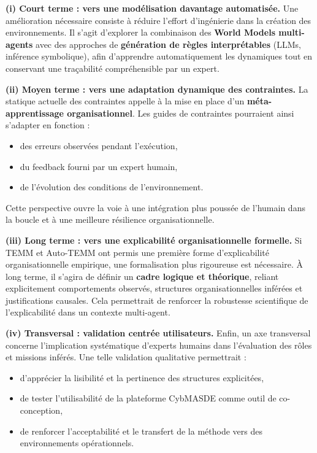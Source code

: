 \medskip
\noindent
\textbf{(i) Court terme : vers une modélisation davantage automatisée.}
Une amélioration nécessaire consiste à réduire l’effort d’ingénierie dans la création des environnements.
Il s’agit d’explorer la combinaison des \textbf{World Models multi-agents} avec des approches de \textbf{génération de règles interprétables} (LLMs, inférence symbolique), afin d’apprendre automatiquement les dynamiques tout en conservant une traçabilité compréhensible par un expert.

\medskip
\noindent
\textbf{(ii) Moyen terme : vers une adaptation dynamique des contraintes.}
La statique actuelle des contraintes appelle à la mise en place d’un \textbf{méta-apprentissage organisationnel}.
Les guides de contraintes pourraient ainsi s’adapter en fonction :
\begin{itemize}
  \item des erreurs observées pendant l’exécution,
  \item du feedback fourni par un expert humain,
  \item de l’évolution des conditions de l’environnement.
\end{itemize}
Cette perspective ouvre la voie à une intégration plus poussée de l’humain dans la boucle et à une meilleure résilience organisationnelle.

\medskip
\noindent
\textbf{(iii) Long terme : vers une explicabilité organisationnelle formelle.}
Si TEMM et Auto-TEMM ont permis une première forme d’explicabilité organisationnelle empirique, une formalisation plus rigoureuse est nécessaire.
À long terme, il s’agira de définir un \textbf{cadre logique et théorique}, reliant explicitement comportements observés, structures organisationnelles inférées et justifications causales.
Cela permettrait de renforcer la robustesse scientifique de l’explicabilité dans un contexte multi-agent.

\medskip
\noindent
\textbf{(iv) Transversal : validation centrée utilisateurs.}
Enfin, un axe transversal concerne l’implication systématique d’experts humains dans l’évaluation des rôles et missions inférés.
Une telle validation qualitative permettrait :
\begin{itemize}
  \item d’apprécier la lisibilité et la pertinence des structures explicitées,
  \item de tester l’utilisabilité de la plateforme CybMASDE comme outil de co-conception,
  \item de renforcer l’acceptabilité et le transfert de la méthode vers des environnements opérationnels.
\end{itemize}

